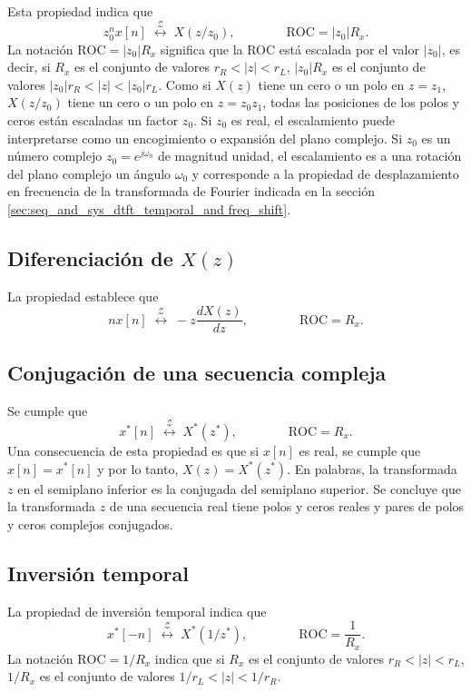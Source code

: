 \documentclass[a4paper]{report}
\begin{document}
Esta propiedad indica que 
\[
 z_0^nx[n]\;\overset{\mathcal{Z}}{\longleftrightarrow}\;X(z/z_0),
 \qquad\qquad\textrm{ROC}=|z_0|R_x.
\]
La notación \(\textrm{ROC}=|z_0|R_x\) significa que la ROC está escalada por el valor \(|z_0|\), es decir, si \(R_x\) es el conjunto de valores \(r_R<|z|<r_L\), \(|z_0|R_x\) es el conjunto de valores \(|z_0|r_R<|z|<|z_0|r_L\). Como si \(X(z)\) tiene un cero o un polo en \(z=z_1\), \(X(z/z_0)\) tiene un cero o un polo en \(z=z_0z_1\), todas las posiciones de los polos y ceros están escaladas un factor \(z_0\). Si \(z_0\) es real, el escalamiento puede interpretarse como un encogimiento o expansión del plano complejo. Si \(z_0\) es un número complejo \(z_0=e^{j\omega_0}\) de magnitud unidad, el escalamiento es a una rotación del plano complejo un ángulo \(\omega_0\) y corresponde a la propiedad de desplazamiento en frecuencia de la transformada de Fourier indicada en la sección \ref{sec:seq_and_sys_dtft_temporal_and freq_shift}.

\subsection{Diferenciación de \texorpdfstring{\(X(z)\)}{X(z)}}

La propiedad establece que 
\[
 nx[n]\;\overset{\mathcal{Z}}{\longleftrightarrow}\;-z\frac{dX(z)}{dz},
 \qquad\qquad\textrm{ROC}=R_x.
\]

\subsection{Conjugación de una secuencia compleja}

Se cumple que 
\[
 x^*[n]\;\overset{\mathcal{Z}}{\longleftrightarrow}\;X^*(z^*),
 \qquad\qquad\textrm{ROC}=R_x.
\]
Una consecuencia de esta propiedad es que si \(x[n]\) es real, se cumple que \(x[n]=x^*[n]\) y por lo tanto, \(X(z)=X^*(z^*)\). En palabras, la transformada \(z\) en el semiplano inferior es la conjugada del semiplano superior. Se concluye que la transformada \(z\) de una secuencia real tiene polos y ceros reales y pares de polos y ceros complejos conjugados.

\subsection{Inversión temporal}

La propiedad de inversión temporal indica que 
\[
 x^*[-n]\;\overset{\mathcal{Z}}{\longleftrightarrow}\;X^*(1/z^*),
 \qquad\qquad\textrm{ROC}=\frac{1}{R_x}.
\]
La notación \(\textrm{ROC}=1/R_x\) indica que si \(R_x\) es el conjunto de valores \(r_R<|z|<r_L\), \(1/R_x\) es el conjunto de valores \(1/r_L<|z|<1/r_R\).
\end{document}
